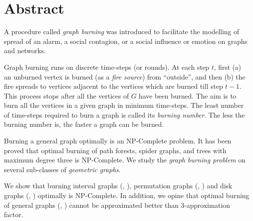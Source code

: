 \chapter*{\centering Abstract}

A procedure called \textit{graph burning} was introduced to facilitate the modelling of spread of an alarm, a social contagion, or a social influence or emotion on graphs and networks.

Graph burning runs on discrete time-steps (or rounds). At each step $t$, first (a) an unburned vertex is burned (as a \textit{fire source}) from ``outside'', and then (b) the fire spreads to vertices adjacent to the vertices which are burned till step $t-1$. This process stops after all the vertices of $G$ have been burned. The aim is to burn all the vertices in a given graph in minimum time-steps. The least number of time-steps required to burn a graph is called its \textit{burning number}. The less the burning number is, the faster a graph can be burned.

Burning a general graph optimally is an NP-Complete problem. It has been proved that optimal burning of path forests, spider graphs, and trees with maximum degree three is NP-Complete. We study the \textit{graph burning problem} on several sub-classes of \textit{geometric graphs}.

We show that burning interval graphs (, ), permutation graphs (, ) and disk graphs (, ) optimally is NP-Complete. In addition, we opine that optimal burning of general graphs (, ) cannot be approximated better than 3-approximation factor.